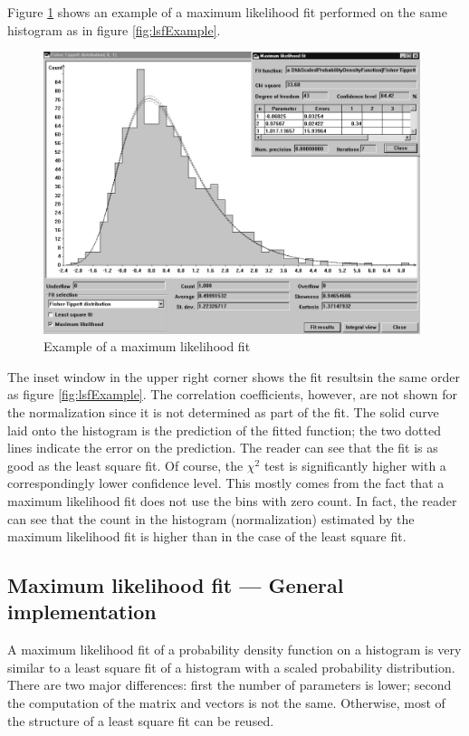 Figure \ref{fig:mlfExample} shows an example of a maximum
likelihood fit performed on the same histogram as in figure
\ref{fig:lsfExample}.
\begin{figure}
\centering\includegraphics[width=11cm]{Figures/MaximumLikelihoodFit}
\caption{Example of a maximum likelihood
fit}\label{fig:mlfExample}
\end{figure}
The inset window in the upper right corner shows the fit resultsin
the same order as figure \ref{fig:lsfExample}. The correlation
coefficients, however, are not shown for the normalization since
it is not determined as part of the fit. The solid curve laid onto
the histogram is the prediction of the fitted function; the two
dotted lines indicate the error on the prediction. The reader can
see that the fit is as good as the least square fit. Of course,
the $\chi^2$ test is significantly higher with a correspondingly
lower confidence level. This mostly comes from the fact that a
maximum likelihood fit does not use the bins with zero count. In
fact, the reader can see that the count in the histogram
(normalization) estimated by the maximum likelihood fit is higher
than in the case of the least square fit.

\subsection{Maximum likelihood fit --- General  implementation}
 A maximum likelihood fit
of a probability density function on a histogram is very similar
to a least square fit of a histogram with a scaled probability
distribution. There are two major differences: first the number of
parameters is lower; second the computation of the matrix and
vectors is not the same. Otherwise, most of the structure of a
least square fit can be reused.

